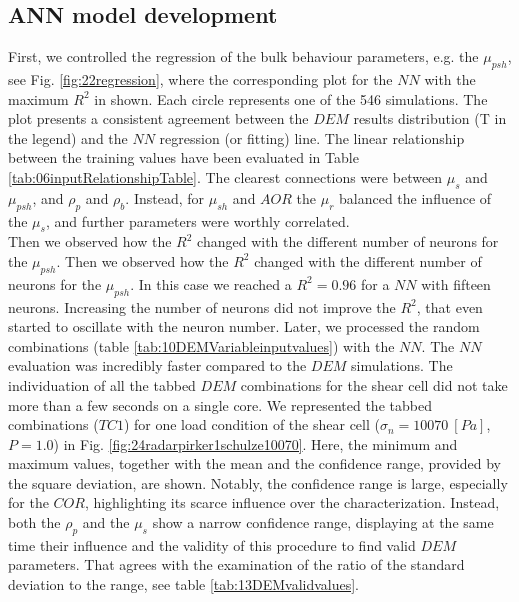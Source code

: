 \subsection{ANN model development}
\label{subsec:annmodeldev}

First, we controlled the regression of the bulk behaviour parameters, e.g. the
$\mu_{psh}$, see Fig. \ref{fig:22regression}, where the corresponding plot for
the $NN$ with the maximum $R^2$ in shown. Each circle represents one of the 546
simulations.
The plot presents a consistent agreement between the $DEM$ results distribution
(T in the legend) and the $NN$ regression (or fitting) line.
% 
The linear relationship between the
training values have been evaluated in Table \ref{tab:06inputRelationshipTable}.
The clearest connections were between $\mu_s$ and $\mu_{psh}$, and
$\rho_p$ and $\rho_b$.
Instead, for $\mu_{sh}$ and $AOR$ the $\mu_r$ balanced the influence of the 
$\mu_s$, and further parameters were worthly correlated. \\
% 
Then we observed how the $R^2$ changed with the different number of neurons for
the $\mu_{psh}$.
Then we observed how the $R^2$ changed with the different number of neurons for the $\mu_{psh}$. 
In this case we reached a $R^2 = 0.96$ for a $NN$ with fifteen neurons. 
Increasing the number of neurons did not improve the $R^2$, that even started to oscillate with the neuron number. 
Later, we processed the random combinations (table
\ref{tab:10DEMVariableinputvalues}) with the $NN$.
The $NN$ evaluation was incredibly faster compared to the $DEM$ simulations. The
individuation of all the tabbed $DEM$ combinations for the shear cell did not take more than a few seconds on a single core. 
We represented the tabbed combinations ($TC1$) for one load condition of the
shear cell ($\sigma_n=10070 ~[Pa]$, $P=1.0$) in Fig.
\ref{fig:24radarpirker1schulze10070}.
% 
Here, the minimum and maximum values, together with the mean and the confidence
range, provided by the square deviation, are shown. Notably, the confidence range is large, 
especially for the $COR$, highlighting its scarce influence over the characterization. 
Instead, both the $\rho_p$  and the $\mu_s$ show a narrow confidence range, 
displaying at the same time their influence and the validity of this procedure to find valid $DEM$ parameters. 
That agrees with the examination of the ratio of the standard deviation to the
range, see table \ref{tab:13DEMvalidvalues}.
